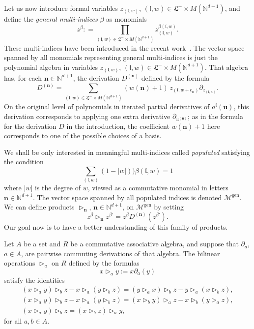 \documentclass[AHL,Unicode,longabstracts]{cedram}
\newcommand{\bn}{\mathbf{n}}
\newcommand{\bu}{\mathbf{u}}
\newcommand{\mcM}{\mathcal{M}}
\newcommand{\mfl}{\mathfrak{l}}
\newcommand{\mfL}{\mathfrak{L}}
\newcommand{\bbN}{\mathbb{N}}
\newcommand{\genn}{\mathrm{gen}}
\begin{document}
Let us now introduce formal variables $z_{(\mfl,w)}$, $(\mfl,w) \in \mfL^-\times M(\bbN^{d+1})$, and define the \emph{general multi-indices} $\beta$ as monomials
\begin{equation}\label{general_multi_indices}
z^{\beta} : = \prod_{(\mfl,w) \in \mfL^-\times M(\bbN^{d+1})} z_{(\mfl,w)}^{\beta(\mfl,w)}.
\end{equation}
These multi-indices have been introduced in the recent work~\cite{BL23}. The vector space spanned by all monomials representing general multi-indices is just the polynomial algebra in variables $z_{(\mfl,w)}$, $(\mfl,w) \in \mfL^-\times M(\bbN^{d+1})$. That algebra has, for each $\bn\in\bbN^{d+1}$, the derivation $D^{(\bn)}$ defined by the formula
\begin{equation}\label{derivations}
D^{(\bn)}=\sum_{(\mfl,w) \in \mfL^-\times M(\bbN^{d+1})} (w(\bn) +1) \, z_{(\mfl,w+e_{\bn})}\partial_{z_{(\mfl,w)}}.
\end{equation}
On the original level of polynomials in iterated partial derivatives of $a^\mfl (\bu)$, this derivation corresponds to applying one extra derivative $\partial_{u^{(\bn)}}$; as in the formula for the derivation $D$ in the introduction, the coefficient $w(\bn)+1$ here corresponds to one of the possible choices of a basis.

We shall be only interested in meaningful multi-indices called \emph{populated} satisfying the condition
\begin{equation}\label{populated_bis}
\sum_{(\mfl,w)} (1 - |w|))\beta(\mfl,w) = 1
\end{equation}
where $ |w|$ is the degree of $w$, viewed as a commutative monomial in letters $\bn\in\bbN^{d+1}$. The vector space spanned by all populated indices is denoted $\mcM^{\genn}$. We can define products $\triangleright_\bn$, $\bn\in\bbN^{d+1}$, on $\mcM^{\genn}$ by setting
\begin{equation}\label{def_products}
z^{\beta} \triangleright_\bn z^{\beta'} = z^{\beta} D^{(\bn)} (z^{\beta'}).
\end{equation}
Our goal now is to have a better understanding of this family of products.

\begin{prop}\label{multi_Nov_example}
Let $A$ be a set and $R$ be a commutative associative algebra, and suppose that $\partial_a$, $a\in A$, are pairwise commuting derivations of that algebra. The bilinear operations $\triangleright_a$ on $R$ defined by the formulas
\[
x\triangleright_a y:=x\partial_a(y)
\]
satisfy the identities
\begin{gather*}
(x \triangleright_a y) \triangleright_b z - x \triangleright_a (y \triangleright_b z) = (y \triangleright_a x) \triangleright_b z - y \triangleright_a (x \triangleright_b z),
\\ (x \triangleright_a y) \triangleright_b z - x \triangleright_a (y \triangleright_b z) = (x\triangleright_b y) \triangleright_a z - x \triangleright_b (y \triangleright_a z),
\\ (x \triangleright_a y) \triangleright_b z = (x \triangleright_b z)\triangleright_a y,
\end{gather*}
for all $ a,b\in A$.
\end{prop}
\end{document}
